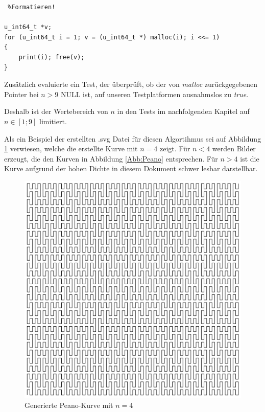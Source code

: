 \documentclass[course=asp]{aspdoc}
\begin{document}
\begin{lstlisting} %Formatieren! 

u_int64_t *v;
for (u_int64_t i = 1; v = (u_int64_t *) malloc(i); i <<= 1)   
{     
    print(i); free(v);
}
\end{lstlisting}

Zus\"atzlich evaluierte ein Test, der \"uberpr\"uft, ob der von \textit{malloc} zur\"uckgegebenen Pointer bei $n > 9$ NULL ist, auf unseren Testplatformen ausnahmslos zu \textit{true}. %

Deshalb ist der Wertebereich von $n$ in den Tests im nachfolgenden Kapitel auf $ n \in [1;9]$ limitiert.

Als ein Beispiel der erstellten .svg Datei f\"ur diesen Algortihmus sei auf Abbildung \ref{Abb:Generierte Kurve Grad 4} verwiesen, welche die erstellte Kurve mit $n = 4$ zeigt. F\"ur $n < 4$ werden Bilder erzeugt, die den Kurven in Abbildung \ref{Abb:Peano} entsprechen. F\"ur $n > 4$ ist die Kurve aufgrund der hohen Dichte in diesem Dokument schwer lesbar darstellbar.

\begin{figure}[ht]
\centering
\includegraphics[scale = 0.2]{peanoGrad4.png}
\caption{Generierte Peano-Kurve mit $n = 4$}\label{Abb:Generierte Kurve Grad 4}
\end{figure}
\end{document}
